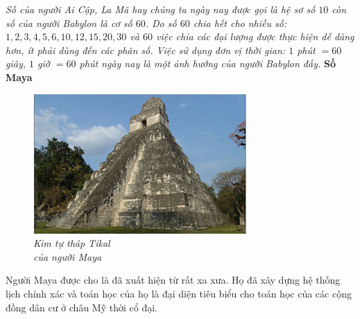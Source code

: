 	\textit{Số của người Ai Cập, La Mã hay chúng ta ngày nay được gọi là hệ sơ số $10$ còn số của người Babylon là cơ số $60$. Do số $60$ chia hết cho nhiều số: $1,2,3,4,5,6, 10, 12, 15, 20,30$ và $60$ việc chia các đại lượng được thực hiện dễ dàng hơn, ít phải dùng đến các phân số. Việc sử dụng đơn vị thời gian: $1$ phút $= 60$ giây, $1$ giờ $= 60$ phút ngày nay là một ảnh hưởng của người Babylon đấy.}
	\vskip 0.1cm
	\textbf{\color{toancuabi}Số Maya}
	\vskip 0.1cm
	\begin{figure}
		\centering
		\vspace*{-15pt}
		\captionsetup{labelformat= empty, justification=centering}
		\includegraphics[width=1\linewidth]{28}
		\caption{\textit{Kim tự tháp Tikal\\ của người Maya}}
		\vspace*{-20pt}
	\end{figure}
	Người Maya  được cho là đã xuất hiện từ rất xa xưa. Họ đã xây dựng hệ thống lịch chính xác và toán học của họ là đại diện tiêu biểu cho toán học của các cộng đồng dân cư ở châu Mỹ thời cổ đại.
	
